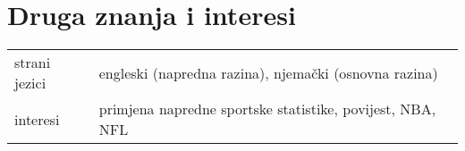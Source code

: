 \documentclass[a4paper]{article}
\makeatletter
\newlength{\tablewidth}
\newenvironment{skills}{%
\setlength{\tablewidth}{\linewidth}
\addtolength{\tablewidth}{-2\tabcolsep}
\begin{tabular}{@{}p{0.15\tablewidth}p{0.85\tablewidth}@{}}
}{%
\end{tabular}
}
\makeatother
\begin{document}

\section{Druga znanja i interesi}
\begin{skills}
	strani jezici & engleski (napredna razina), njemački (osnovna razina) \\
	interesi & primjena napredne sportske statistike, povijest, NBA, NFL\\
\end{skills}
\end{document}
